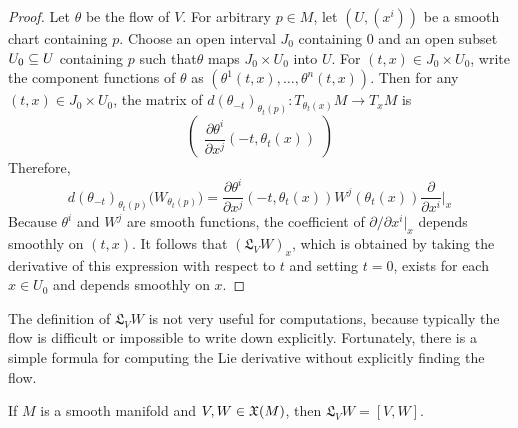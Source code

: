 \begin{proof}
Let $\theta$ be the flow of $V$. For arbitrary $p\in M$, let $(U,(x^i))$ be a smooth chart containing $p$. Choose an open interval $J_0$ containing $0$ and an open subset $U_0\subseteq U$ containing $p$ such that$\theta$ maps $J_0\times U_0$ into $U$. For $(t,x)\in J_0\times U_0$, write the component functions of $\theta$ as $(\theta^1(t,x),\dots,\theta^n(t,x))$. Then for any $(t,x)\in J_0\times U_0$,
the matrix of $d(\theta_{-t})_{\theta_t(p)}:T_{\theta_t(x)}M\to T_xM$ is
\[\begin{pmatrix}
\dfrac{\partial\theta^i}{\partial x^j}(-t,\theta_t(x))
\end{pmatrix}\]
Therefore,
\[d(\theta_{-t})_{\theta_t(p)}\big(W_{\theta_t(p)}\big)=\dfrac{\partial\theta^i}{\partial x^j}(-t,\theta_t(x))W^j(\theta_t(x))\frac{\partial}{\partial x^i}\Big|_x\]
Because $\theta^i$ and $W^j$ are smooth functions, the coefficient of $\partial/\partial x^i|_x$ depends smoothly on $(t,x)$. It follows that $(\mathfrak{L}_VW)_x$, which is obtained by taking the derivative of this expression with respect to $t$ and setting $t=0$, exists for each $x\in U_0$ and
depends smoothly on $x$.
\end{proof}
The definition of $\mathfrak{L}_VW$ is not very useful for computations, because typically the flow is difficult or impossible to write down explicitly. Fortunately, there is a simple formula for computing the Lie derivative without explicitly finding the flow.
\begin{theorem}\label{Lie derivative bracket}
If $M$ is a smooth manifold and $V,W\in\mathfrak{X}(M)$, then $\mathfrak{L}_VW=[V,W]$.
\end{theorem}
